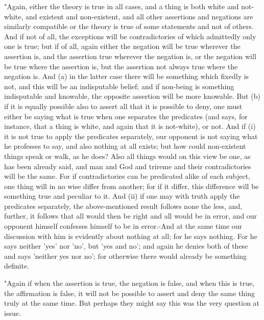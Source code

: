 "Again, either the theory is true in all cases, and a thing is both
white and not-white, and existent and non-existent, and all other
assertions and negations are similarly compatible or the theory is
true of some statements and not of others. And if not of all, the
exceptions will be contradictories of which admittedly only one is
true; but if of all, again either the negation will be true wherever
the assertion is, and the assertion true wherever the negation is,
or the negation will be true where the assertion is, but the assertion
not always true where the negation is. And (a) in the latter case
there will be something which fixedly is not, and this will be an
indisputable belief; and if non-being is something indisputable and
knowable, the opposite assertion will be more knowable. But (b) if
it is equally possible also to assert all that it is possible to deny,
one must either be saying what is true when one separates the predicates
(and says, for instance, that a thing is white, and again that it
is not-white), or not. And if (i) it is not true to apply the predicates
separately, our opponent is not saying what he professes to say, and
also nothing at all exists; but how could non-existent things speak
or walk, as he does? Also all things would on this view be one, as
has been already said, and man and God and trireme and their contradictories
will be the same. For if contradictories can be predicated alike of
each subject, one thing will in no wise differ from another; for if
it differ, this difference will be something true and peculiar to
it. And (ii) if one may with truth apply the predicates separately,
the above-mentioned result follows none the less, and, further, it
follows that all would then be right and all would be in error, and
our opponent himself confesses himself to be in error.-And at the
same time our discussion with him is evidently about nothing at all;
for he says nothing. For he says neither 'yes' nor 'no', but 'yes
and no'; and again he denies both of these and says 'neither yes nor
no'; for otherwise there would already be something definite.

"Again if when the assertion is true, the negation is false, and when
this is true, the affirmation is false, it will not be possible to
assert and deny the same thing truly at the same time. But perhaps
they might say this was the very question at issue. 

